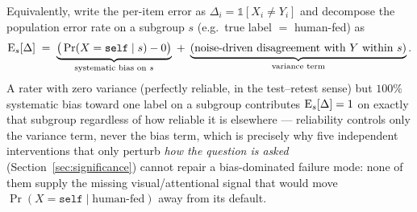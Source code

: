 Equivalently, write the per-item error as
$\Delta_i = \mathbb{1}[X_i \ne Y_i]$ and decompose the population error
rate on a subgroup $s$ (e.g.\ true label $=$ human-fed) as
\[
  \operatorname{E}_s[\Delta] \;=\; \underbrace{\big(\Pr(X = \texttt{self} \mid s) - 0\big)}_{\text{systematic bias on } s}
  \;+\; \underbrace{\text{(noise-driven disagreement with } Y \text{ within } s\text{)}}_{\text{variance term}} .
\]
A rater with zero variance (perfectly reliable, in the test--retest sense)
but $100\%$ systematic bias toward one label on a subgroup contributes
$\operatorname{E}_s[\Delta] = 1$ on exactly that subgroup regardless of how reliable it
is elsewhere --- reliability controls only the variance term, never the
bias term, which is precisely why five independent interventions that only
perturb \emph{how the question is asked} (Section~\ref{sec:significance})
cannot repair a bias-dominated failure mode: none of them supply the
missing visual/attentional signal that would move $\Pr(X=\texttt{self}\mid
\text{human-fed})$ away from its default.
